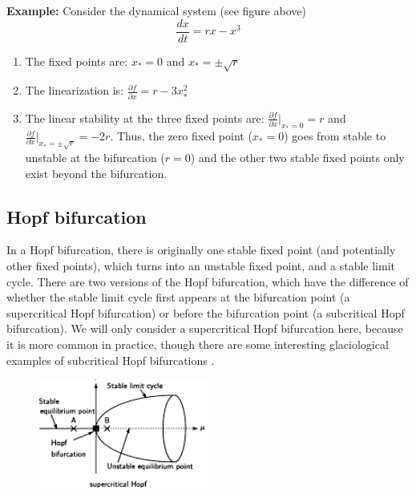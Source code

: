 \documentclass[12pt]{article}
\theoremstyle{definition}
\newcommand{\pd}[2]{\frac{\partial {#1}}{\partial {#2}}}
\begin{document}
\begin{shaded}
\textbf{Example:} Consider the dynamical system (see figure above)
\begin{equation}
\frac{dx}{dt} = rx - x^3
\end{equation}
\begin{enumerate}
\item The fixed points are: $x_* = 0$ and $x_* = \pm \sqrt{r}$
\item The linearization is: $\pd{f}{x} = r - 3x_*^2$
\item The linear stability at the three fixed points are: $\pd{f}{x}|_{x_* = 0} = r$ and $\pd{f}{x}|_{x_* = \pm \sqrt{r}} = -2r$. Thus, the zero fixed point ($x_* = 0$) goes from stable to unstable at the bifurcation ($r=0$) and the other two stable fixed points only exist beyond the bifurcation.
\end{enumerate}
\end{shaded}

\subsection{Hopf bifurcation}
In a Hopf bifurcation, there is originally one stable fixed point (and potentially other fixed points), which turns into an unstable fixed point, and a stable limit cycle. There are two versions of the Hopf bifurcation, which have the difference of whether the stable limit cycle first appears at the bifurcation point (a supercritical Hopf bifurcation) or before the bifurcation point (a subcritical Hopf bifurcation). We will only consider a supercritical Hopf bifurcation here, because it is more common in practice, though there are some interesting glaciological examples of subcritical Hopf bifurcations \cite[i.e.][]{robel-2013:ISvariability}.

\begin{figure}[h]
  \begin{center}
\includegraphics[width=0.5\textwidth]{Hopf_bifurcation_diagram.png}
  \end{center}
\end{figure}
\end{document}
